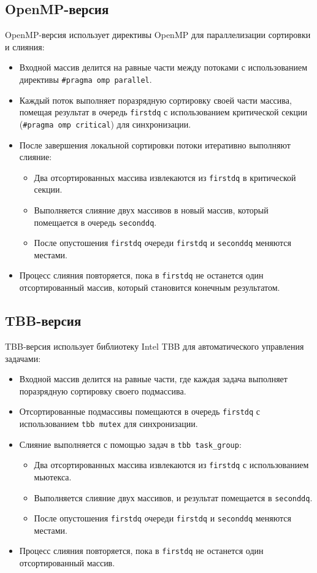 \documentclass[a4paper,12pt]{article}
\begin{document}
\subsection{OpenMP-версия}
OpenMP-версия использует директивы OpenMP для параллелизации сортировки и слияния:
\begin{itemize}
    \item Входной массив делится на равные части между потоками с использованием директивы \texttt{\#pragma omp parallel}.
    \item Каждый поток выполняет поразрядную сортировку своей части массива, помещая результат в очередь \texttt{firstdq} с использованием критической секции (\texttt{\#pragma omp critical}) для синхронизации.
    \item После завершения локальной сортировки потоки итеративно выполняют слияние:
        \begin{itemize}
            \item Два отсортированных массива извлекаются из \texttt{firstdq} в критической секции.
            \item Выполняется слияние двух массивов в новый массив, который помещается в очередь \texttt{seconddq}.
            \item После опустошения \texttt{firstdq} очереди \texttt{firstdq} и \texttt{seconddq} меняются местами.
        \end{itemize}
    \item Процесс слияния повторяется, пока в \texttt{firstdq} не останется один отсортированный массив, который становится конечным результатом.
\end{itemize}

\subsection{TBB-версия}
TBB-версия использует библиотеку Intel TBB для автоматического управления задачами:
\begin{itemize}
    \item Входной массив делится на равные части, где каждая задача выполняет поразрядную сортировку своего подмассива.
    \item Отсортированные подмассивы помещаются в очередь \texttt{firstdq} с использованием \texttt{tbb mutex} для синхронизации.
    \item Слияние выполняется с помощью задач в \texttt{tbb task\_group}:
        \begin{itemize}
            \item Два отсортированных массива извлекаются из \texttt{firstdq} с использованием мьютекса.
            \item Выполняется слияние двух массивов, и результат помещается в \texttt{seconddq}.
            \item После опустошения \texttt{firstdq} очереди \texttt{firstdq} и \texttt{seconddq} меняются местами.
        \end{itemize}
    \item Процесс слияния повторяется, пока в \texttt{firstdq} не останется один отсортированный массив.
\end{itemize}
\end{document}

